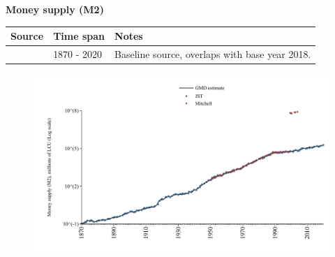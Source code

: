 \documentclass[12pt,a4paper,landscape]{article}
\begin{document}
\begin{adjustbox}{max totalsize={\paperwidth}{\paperheight},center}
\begin{minipage}[t][\textheight][t]{\textwidth}
\vspace*{0.5cm}
{}
\begin{center}
{\Large\bfseries Money supply (M2)}
\end{center}
\vspace{0.5cm}
\begin{table}[H]
\centering
\small
\begin{tabular}{|l|l|l|}
\hline
\textbf{Source} & \textbf{Time span} & \textbf{Notes} \\
\hline
\rowcolor{white}\cite{JST}& 1870 - 2020 &Baseline source, overlaps with base year 2018. \\
\hline
\end{tabular}
\end{table}
\begin{figure}[H]
\centering
\includegraphics[width=\textwidth,height=0.6\textheight,keepaspectratio]{graphs/FIN_M2.pdf}
\end{figure}
\end{minipage}
\end{adjustbox}
\end{document}
